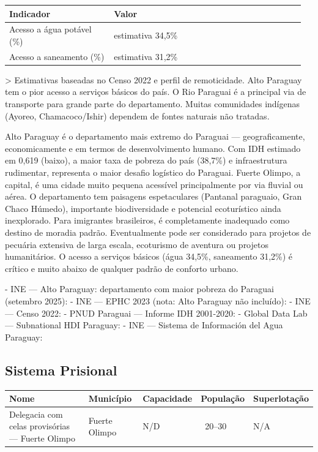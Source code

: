 {\small
\setlength{\tabcolsep}{3pt}
\renewcommand{\arraystretch}{1.12}
\begin{tabularx}{\linewidth}{>{\raggedright\arraybackslash}p{0.34\linewidth} >{\raggedright\arraybackslash}p{0.62\linewidth}}
\toprule
Indicador & Valor \\
\midrule
Acesso a água potável (\%) & estimativa 34,5\% \\
Acesso a saneamento (\%) & estimativa 31,2\% \\
\bottomrule
\end{tabularx}
}

> Estimativas baseadas no Censo 2022 e perfil de remoticidade. Alto Paraguay tem o pior acesso a serviços básicos do país. O Rio Paraguai é a principal via de transporte para grande parte do departamento. Muitas comunidades indígenas (Ayoreo, Chamacoco/Ishir) dependem de fontes naturais não tratadas.


Alto Paraguay é o departamento mais extremo do Paraguai --- geograficamente, economicamente e em termos de desenvolvimento humano. Com IDH estimado em 0,619 (baixo), a maior taxa de pobreza do país (38,7\%) e infraestrutura rudimentar, representa o maior desafio logístico do Paraguai. Fuerte Olimpo, a capital, é uma cidade muito pequena acessível principalmente por via fluvial ou aérea. O departamento tem paisagens espetaculares (Pantanal paraguaio, Gran Chaco Húmedo), importante biodiversidade e potencial ecoturístico ainda inexplorado. Para imigrantes brasileiros, é completamente inadequado como destino de moradia padrão. Eventualmente pode ser considerado para projetos de pecuária extensiva de larga escala, ecoturismo de aventura ou projetos humanitários. O acesso a serviços básicos (água 34,5\%, saneamento 31,2\%) é crítico e muito abaixo de qualquer padrão de conforto urbano.


- INE --- Alto Paraguay: departamento com maior pobreza do Paraguai (setembro 2025): 
- INE --- EPHC 2023 (nota: Alto Paraguay não incluído): 
- INE --- Censo 2022: 
- PNUD Paraguai --- Informe IDH 2001-2020: 
- Global Data Lab --- Subnational HDI Paraguay: 
- INE --- Sistema de Información del Agua Paraguay: 


\subsection{Sistema Prisional}



{\small
\setlength{\tabcolsep}{3pt}
\renewcommand{\arraystretch}{1.12}
{\small
\begin{tabularx}{\linewidth}{lXXXX}
\toprule
Nome & Município & Capacidade & População & Superlotação \\
\midrule
Delegacia com celas provisórias --- Fuerte Olimpo & Fuerte Olimpo & N/D & ~20--30 & N/A \\
\bottomrule
\end{tabularx}
}
}

